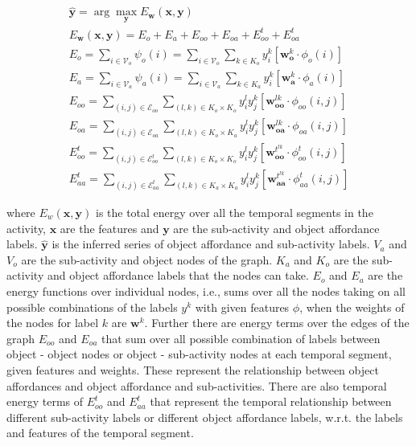 \documentclass{article} %
\begin{document}
\begin{gather}
\hat{\mathbf{y}} = \arg\!\max_{\mathbf{y}} E_{\mathbf{w}} (\mathbf{x},
\mathbf{y})\\
E_{\mathbf{w}} (\mathbf{x}, \mathbf{y}) = E_o + E_a + E_{oo} + E_{oa}
+ E^t_{oo} + E^t_{oa} \\
E_o = \sum\limits_{i \in \mathcal{V}_o} \psi_o(i) = \sum\limits_{i \in
\mathcal{V}_o} \sum\limits_{k \in K_o}y^k_i \left[
\mathbf{w}^k_{\mathbf{o}} \cdot \phi_o(i) \right] \\
E_a = \sum\limits_{i \in \mathcal{V}_a} \psi_a(i) = \sum\limits_{i \in
\mathcal{V}_a} \sum\limits_{k \in K_a}y^k_i \left[
\mathbf{w}^k_{\mathbf{a}} \cdot \phi_a(i) \right] \\
E_{oo} = \sum\limits_{(i,j) \in \mathcal{E}_{oo}} \sum\limits_{(l,k)
\in K_o \times K_o} y^l_i y^k_j \left[ \mathbf{w}^{lk}_{\mathbf{oo}}
\cdot \phi_{oo}(i,j) \right] \\
E_{oa} = \sum\limits_{(i,j) \in \mathcal{E}_{oa}} \sum\limits_{(l,k)
\in K_o \times K_a} y^l_i y^k_j \left[ \mathbf{w}^{lk}_{\mathbf{oa}}
\cdot \phi_{oa}(i,j) \right] \\
E^t_{oo} = \sum\limits_{(i,j) \in \mathcal{E}^t_{oo}}
\sum\limits_{(l,k) \in K_o \times K_o} y^l_i y^k_j \left[
\mathbf{w}^{t^{lk}}_{\mathbf{oo}} \cdot \phi^t_{oo}(i,j) \right] \\
E^t_{aa} = \sum\limits_{(i,j) \in \mathcal{E}^t_{aa}}
\sum\limits_{(l,k) \in K_a \times K_a} y^l_i y^k_j \left[
\mathbf{w}^{t^{lk}}_{\mathbf{aa}} \cdot \phi^t_{aa}(i,j) \right]
\end{gather}

where $E_w(\mathbf{x},\mathbf{y})$ is the total energy over all the temporal segments in the activity, $\mathbf{x}$ are the features and $\mathbf{y}$ are the sub-activity and object affordance labels. $\hat{\mathbf{y}}$ is the inferred series of object affordance and sub-activity labels. $V_a$ and $V_o$ are the sub-activity and object nodes of the graph. $K_a$ and $K_o$ are the sub-activity and object affordance labels that the nodes can take. $E_o$ and $E_a$ are the energy functions over individual nodes, i.e., sums over all the nodes taking on all possible combinations of the labels $y^k$ with given features $\phi$, when the weights of the nodes for label $k$ are $\mathbf{w}^k$. Further there are energy terms over the edges of the graph $E_{oo}$ and $E_{oa}$ that sum over all possible combination of labels between object - object nodes or object - sub-activity nodes at each temporal segment, given features and weights. These represent the relationship between object affordances and object affordance and sub-activities.  There are also temporal energy terms of $E_{oo}^{t}$ and $E_{aa}^{t}$ that represent the temporal relationship between different sub-activity labels or different object affordance labels, w.r.t. the labels and features of the temporal segment. 
\end{document}
